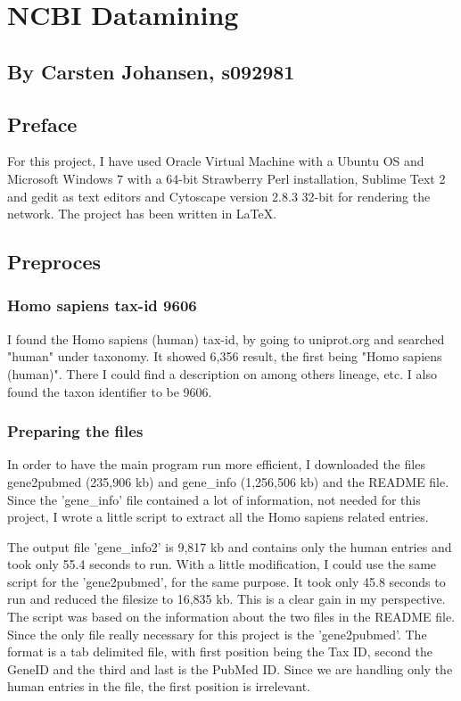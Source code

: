 


\chapter*{NCBI Datamining}
\section*{By Carsten Johansen, s092981}

\section*{Preface}
For this project, I have used Oracle Virtual Machine with a Ubuntu OS and Microsoft Windows 7 with a 64-bit Strawberry Perl installation, Sublime Text 2 and gedit as text editors and Cytoscape version 2.8.3 32-bit for rendering the network. The project has been written in LaTeX.

\section*{Preproces}

\subsection*{Homo sapiens tax-id 9606}
I found the Homo sapiens (human) tax-id, by going to uniprot.org and searched "human" under taxonomy. It showed 6,356 result, the first being "Homo sapiens (human)". There I could find a description on among others lineage, etc. I also found the taxon identifier to be 9606.

\subsection*{Preparing the files}
In order to have the main program run more efficient, I downloaded the files gene2pubmed (235,906 kb) and gene\_info (1,256,506 kb) and the README file. Since the 'gene\_info' file contained a lot of information, not needed for this project, I wrote a little script to extract all the Homo sapiens related entries. 



The output file 'gene\_info2' is 9,817 kb and contains only the human entries and took only 55.4 seconds to run. With a little modification, I could use the same script for the 'gene2pubmed', for the same purpose. It took only 45.8 seconds to run and reduced the filesize to 16,835 kb. This is a clear gain in my perspective. The script was based on the information about the two files in the README file.
Since the only file really necessary for this project is the 'gene2pubmed'. The format is a tab delimited file, with first position being the Tax ID, second the GeneID and the third and last is the PubMed ID. Since we are handling only the human entries in the file, the first position is irrelevant.

